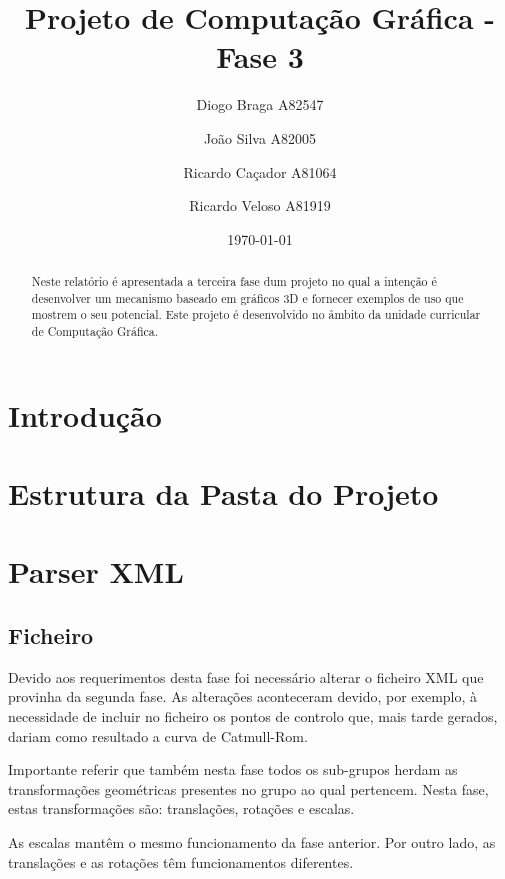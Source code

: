 \documentclass[a4paper]{article}
\title{Projeto de Computação Gráfica - Fase 3}
\author{Diogo Braga A82547 \and João Silva A82005 \and Ricardo Caçador A81064
\and Ricardo Veloso A81919}
\date{\today}
\begin{document}
\maketitle

\begin{abstract}
Neste relatório é apresentada a terceira fase dum projeto no qual a intenção é desenvolver um mecanismo baseado em gráficos 3D e fornecer exemplos de uso que mostrem o seu potencial. Este projeto é desenvolvido no âmbito da unidade curricular de Computação Gráfica.
\end{abstract}


\newpage

\tableofcontents


\newpage

\section{Introdução}
\label{sec:intro}



\section{Estrutura da Pasta do Projeto}
\label{sec:estrutura}


\newpage

\section{Parser XML}
\label{sec:parser}

\subsection{Ficheiro}
\label{sec:ficheiro}

Devido aos requerimentos desta fase foi necessário alterar o ficheiro XML que provinha da segunda fase. As alterações aconteceram devido, por exemplo, à necessidade de incluir no ficheiro os pontos de controlo que, mais tarde gerados, dariam como resultado a curva de Catmull-Rom.

Importante referir que também nesta fase todos os sub-grupos herdam as transformações geométricas presentes no grupo ao qual pertencem. Nesta fase, estas transformações são: translações, rotações e escalas.

As escalas mantêm o mesmo funcionamento da fase anterior. Por outro lado, as translações e as rotações têm funcionamentos diferentes.
\end{document}
